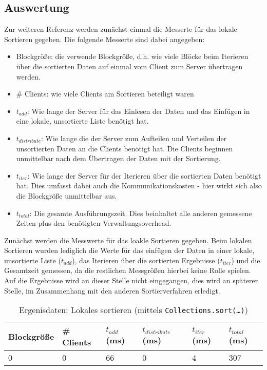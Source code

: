 \documentclass[fontsize=12pt,a4paper,headinclude=no,headings=small]{scrartcl}
\begin{document}
\subsection{Auswertung}
Zur weiteren Referenz werden zunächst einmal die Messerte für das lokale Sortieren gegeben. 
Die folgende Messerte sind dabei angegeben:
\begin{itemize}
  \item Blockgröße: die verwende Blockgröße, d.h. wie viele Blöcke beim Iterieren über die sortierten Daten auf einmal vom Client zum Server übertragen werden.
  \item \# Clients: wie viele Clients am Sortieren beteiligt waren
  \item $t_{add}$: Wie lange der Server für das Einlesen der Daten und das Einfügen in eine lokale, unsortierte Liste benötigt hat.
  \item $t_{distribute}$: Wie lange die der Server zum Aufteilen und Verteilen der unsortierten Daten an die Clients benötigt hat. Die Clients beginnen unmittelbar nach dem Übertragen der Daten mit der Sortierung.
  \item $t_{iter}$: Wie lange der Server für der Iterieren über die sortierten Daten benötigt hat. Dies umfasst dabei auch die Kommunikationskosten - hier wirkt sich also die Blockgröße unmittelbar aus.
  \item  $t_{total}$: Die gesamte Ausführungszeit. Dies beinhaltet alle anderen gemessene Zeiten plus den benötigten Verwaltungsoverhead.  
\end{itemize}

Zunächst werden die Messwerte für das loakle Sortieren gegeben. Beim lokalen Sortieren wurden lediglich die Werte für das einfügen der Daten in einer lokale, unsortierte Liste ($t_{add}$), das Iterieren über die sortierten Ergebnisse ($t_{iter}$) und die Gesamtzeit gemessen, da die restlichen Messgrößen hierbei keine Rolle spielen. Auf die Ergebnisse wird an dieser Stelle nicht eingegangen, dies wird an späterer Stelle, im Zusammenhang mit den anderen Sortierverfahren erledigt. 
\begin{table}[htp]
\begin{tabularx}{\textwidth}{ |X|X|X|X|X|X| }
\hline
Blockgröße & \# Clients & $t_{add}$ (ms) & $t_{distribute}$ (ms) & $t_{iter}$ (ms) & $t_{total}$ (ms) \\
\hline
0 & 0 & 66 & 0 & 4 & 307 \\
\hline
\end{tabularx}
\caption{Ergenisdaten: Lokales sortieren (mittels \texttt{Collections.sort(\ldots)})}
\end{table}
\end{document}
